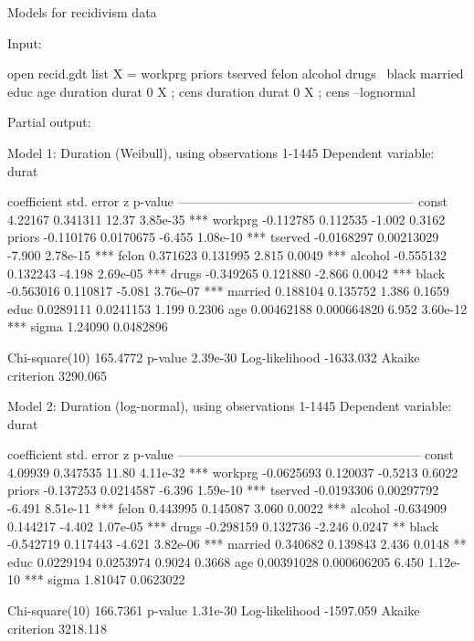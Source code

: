 \begin{script}[htbp]
  \caption{Models for recidivism data}
Input:
\begin{scodebit}
open recid.gdt
list X = workprg priors tserved felon alcohol drugs \
 black married educ age
duration durat 0 X ; cens
duration durat 0 X ; cens --lognormal
\end{scodebit}
Partial output:
\begin{scodebit}
Model 1: Duration (Weibull), using observations 1-1445
Dependent variable: durat

             coefficient   std. error      z      p-value 
  --------------------------------------------------------
  const       4.22167      0.341311      12.37    3.85e-35 ***
  workprg    -0.112785     0.112535      -1.002   0.3162  
  priors     -0.110176     0.0170675     -6.455   1.08e-10 ***
  tserved    -0.0168297    0.00213029    -7.900   2.78e-15 ***
  felon       0.371623     0.131995       2.815   0.0049   ***
  alcohol    -0.555132     0.132243      -4.198   2.69e-05 ***
  drugs      -0.349265     0.121880      -2.866   0.0042   ***
  black      -0.563016     0.110817      -5.081   3.76e-07 ***
  married     0.188104     0.135752       1.386   0.1659  
  educ        0.0289111    0.0241153      1.199   0.2306  
  age         0.00462188   0.000664820    6.952   3.60e-12 ***
  sigma       1.24090      0.0482896                      

Chi-square(10)       165.4772   p-value              2.39e-30
Log-likelihood      -1633.032   Akaike criterion     3290.065

Model 2: Duration (log-normal), using observations 1-1445
Dependent variable: durat

             coefficient   std. error       z      p-value 
  ---------------------------------------------------------
  const       4.09939      0.347535      11.80     4.11e-32 ***
  workprg    -0.0625693    0.120037      -0.5213   0.6022  
  priors     -0.137253     0.0214587     -6.396    1.59e-10 ***
  tserved    -0.0193306    0.00297792    -6.491    8.51e-11 ***
  felon       0.443995     0.145087       3.060    0.0022   ***
  alcohol    -0.634909     0.144217      -4.402    1.07e-05 ***
  drugs      -0.298159     0.132736      -2.246    0.0247   **
  black      -0.542719     0.117443      -4.621    3.82e-06 ***
  married     0.340682     0.139843       2.436    0.0148   **
  educ        0.0229194    0.0253974      0.9024   0.3668  
  age         0.00391028   0.000606205    6.450    1.12e-10 ***
  sigma       1.81047      0.0623022                       

Chi-square(10)       166.7361   p-value              1.31e-30
Log-likelihood      -1597.059   Akaike criterion     3218.118

\end{scodebit}
\label{ex:duration1}
\end{script}

